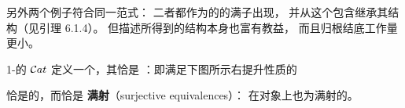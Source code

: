 另外两个例子符合同一范式：
二者都作为\trQuasiCategory{}的\trInfinityCosmos{}的满子\trCategory{}出现，
并从这个包含继承其\trInfinityCosmos{}结构（见引理 6.1.4）。
但描述所得到的\trInfinityCosmos{}结构本身也富有教益，
而且归根结底工作量更小。

\begin{proposition}\label{prop:cosmos-categories}
1-\trCategory{}的\trCategory{} $\mathcal{C}at$
定义一个\trInfinityCosmos{}，其\trIsofibration{}恰是
\textbf{\trIsofibration}：即满足下图所示右提升性质的\trFunctor
\begin{center}
\end{center}
\trEquivalence{}恰是\trCategory{}的\trEquivalence{}，而\trTrivialFibration{}恰是
\textbf{满射\trEquivalence}（surjective equivalences）：
在对象上也为满射的\trCategory\trEquivalence{}。
\end{proposition}
